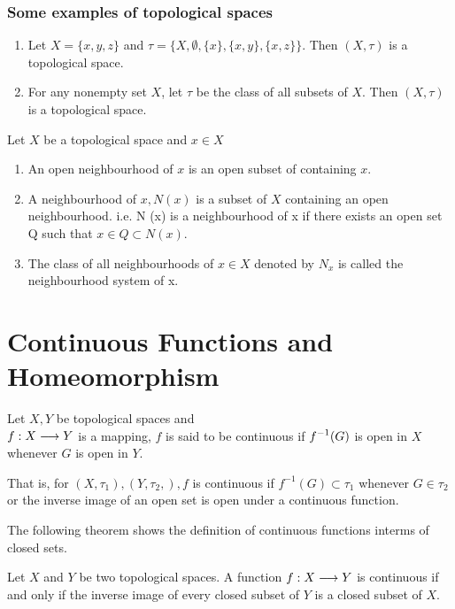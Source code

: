 \subsubsection*{Some examples of topological spaces}
\begin{enumerate}
    \item Let $X = \{x,y,z\}$ and $\tau = \{X, \emptyset, \{x\}, \{x,y\}, \{x,z\}\}$. Then $(X, \tau)$ is a topological space.
    \item For any nonempty set $X$, let $\tau$ be the class of all  subsets of $X$. Then $(X, \tau)$ is a topological space.
\end{enumerate}

\begin{defn}
    Let $X$ be a topological space and $x \in X$ 
    \begin{enumerate}
        \item An open neighbourhood of $x$ is an open subset of containing $x$.
        \item A neighbourhood of $x, N(x)$ is a subset of $X$ containing an open neighbourhood. i.e. N (x) is a neighbourhood of x if there exists an open set Q such that $x \in Q \subset N (x)$.
        \item The class of all neighbourhoods of $x \in X$ denoted by $N_x$ is called the neighbourhood system of x.
    \end{enumerate}
\end{defn}

\section{Continuous Functions and Homeomorphism}

\begin{defn}
    Let $X,Y$ be topological spaces and \\
    $\displaystyle f: X \longrightarrow Y$ is a mapping, $f$ is said to be continuous if $\displaystyle f^{-1}(G)$ is open in $X$ whenever $G$ is open in $Y$.

    That is, for $(X, \tau_1),(Y, \tau_2,), f$ is continuous if $f^{-1} (G) \subset \tau_1$ whenever $G \in \tau_2$ or the inverse image of an open set is open under a continuous function.
\end{defn}
The following theorem shows the definition of continuous functions interms of closed sets.

\begin{thm}
    Let $X$ and $Y$ be two topological spaces. A function $f : X \longrightarrow Y$ is continuous if and only if the inverse image of every closed subset of $Y$ is a closed subset of $X$.
\end{thm}

